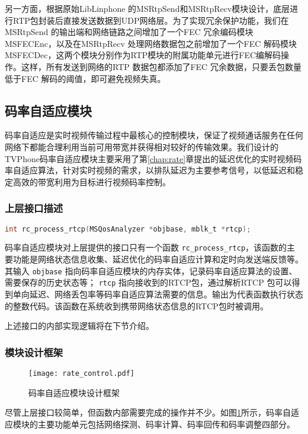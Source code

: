 另一方面，根据原始LibLinphone 的MSRtpSend和MSRtpRecv模块设计，底层进行RTP包封装后直接发送数据到UDP网络层。为了实现冗余保护功能，我们在MSRtpSend 的输出端和网络链路之间增加了一个FEC 冗余编码模块 MSFECEnc，以及在MSRtpRecv 处理网络数据包之前增加了一个FEC 解码模块 MSFECDec，这两个模块分别作为RTP模块的附属功能单元进行FEC编解码操作。这样，所有发送到网络的RTP 数据包都添加了FEC 冗余数据，只要丢包数量低于FEC 解码的阈值，即可避免视频失真。


\subsection{码率自适应模块}
码率自适应是实时视频传输过程中最核心的控制模块，保证了视频通话服务在任何网络下都能合理利用当前可用带宽并获得相对较好的传输效果。我们设计的TVPhone码率自适应模块主要采用了第\ref{chap:rate}章提出的延迟优化的实时视频码率自适应算法，针对实时视频的需求，以排队延迟为主要参考信号，以低延迟和稳定高效的带宽利用为目标进行视频码率控制。

    \subsubsection{上层接口描述}
    \begin{lstlisting}[language=C]
int rc_process_rtcp(MSQosAnalyzer *objbase, mblk_t *rtcp);
    \end{lstlisting}

    码率自适应模块对上层提供的接口只有一个函数 \lstinline!rc_process_rtcp!，该函数的主要功能是网络状态信息收集、延迟优化的码率自适应计算和定时向发送端反馈等。其输入 \lstinline!objbase! 指向码率自适应模块的内存实体，记录码率自适应算法的设置、需要保存的历史状态等； \lstinline!rtcp! 指向接收到的RTCP包，通过解析RTCP 包可以得到单向延迟、网络丢包率等码率自适应算法需要的信息。输出为代表函数执行状态的整数代码。该函数在系统收到携带网络状态信息的RTCP包时被调用。

    上述接口的内部实现逻辑将在下节介绍。

    \subsubsection{模块设计框架}
    \begin{figure}[htbp]
      \centering
      \texttt{[image: rate\_control.pdf]}
      \caption{码率自适应模块设计框架}
      \label{fig:rate_control_arch}
    \end{figure}

    尽管上层接口较简单，但函数内部需要完成的操作并不少。如图\ref{fig:rate_control_arch}所示，码率自适应模块的主要功能单元包括网络探测、码率计算、码率回传和码率调整四部分。

